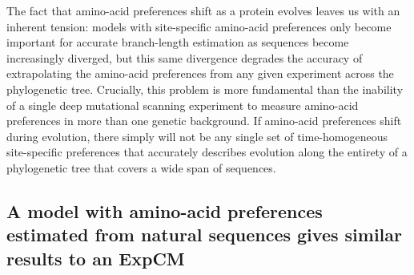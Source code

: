 \documentclass[11pt]{article}
\begin{document}
The fact that amino-acid preferences shift as a protein evolves leaves us with an inherent tension: models with site-specific amino-acid preferences only become important for accurate branch-length estimation as sequences become increasingly diverged, but this same divergence degrades the accuracy of extrapolating the amino-acid preferences from any given experiment across the phylogenetic tree.
Crucially, this problem is more fundamental than the inability of a single deep mutational scanning experiment to measure amino-acid preferences in more than one genetic background.
If amino-acid preferences shift during evolution, there simply will not be any single set of time-homogeneous site-specific preferences that accurately describes evolution along the entirety of a phylogenetic tree that covers a wide span of sequences.

\subsection*{A model with amino-acid preferences estimated from natural sequences gives similar results to an ExpCM}
\end{document}
